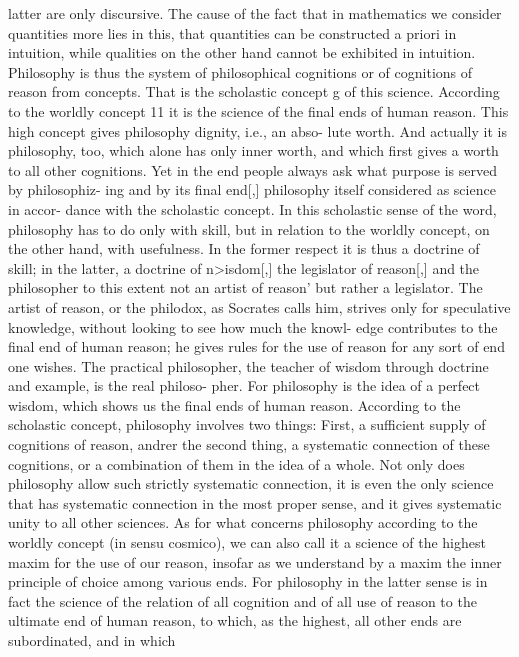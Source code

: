 latter are only discursive. The cause of the fact that in mathematics we
consider quantities more lies in this, that quantities can be constructed a
priori in intuition, while qualities on the other hand cannot be exhibited in
intuition.
Philosophy is thus the system of philosophical cognitions or of cognitions
of reason from concepts. That is the scholastic concept g of this science.
According to the worldly concept 11 it is the science of the final ends of
human reason. This high concept gives philosophy dignity, i.e., an abso-
lute worth. And actually it is philosophy, too, which alone has only inner
worth, and which first gives a worth to all other cognitions.
Yet in the end people always ask what purpose is served by philosophiz-
ing and by its final end[,] philosophy itself considered as science in accor-
dance with the scholastic concept.
In this scholastic sense of the word, philosophy has to do only with skill,
but in relation to the worldly concept, on the other hand, with usefulness.
In the former respect it is thus a doctrine of skill; in the latter, a doctrine of
n>isdom[,] the legislator of reason[,] and the philosopher to this extent not
an artist of reason' but rather a legislator.
The artist of reason, or the philodox, as Socrates calls him, strives only
for speculative knowledge, without looking to see how much the knowl-
edge contributes to the final end of human reason; he gives rules for the
use of reason for any sort of end one wishes. The practical philosopher,
the teacher of wisdom through doctrine and example, is the real philoso-
pher. For philosophy is the idea of a perfect wisdom, which shows us the
final ends of human reason.
According to the scholastic concept, philosophy involves two things:
First, a sufficient supply of cognitions of reason, andrer the second thing,
a systematic connection of these cognitions, or a combination of them in
the idea of a whole.
Not only does philosophy allow such strictly systematic connection, it is
even the only science that has systematic connection in the most proper
sense, and it gives systematic unity to all other sciences.
As for what concerns philosophy according to the worldly concept (in
sensu cosmico), we can also call it a science of the highest maxim for the use of
our reason, insofar as we understand by a maxim the inner principle of
choice among various ends.
For philosophy in the latter sense is in fact the science of the relation of
all cognition and of all use of reason to the ultimate end of human reason,
to which, as the highest, all other ends are subordinated, and in which
